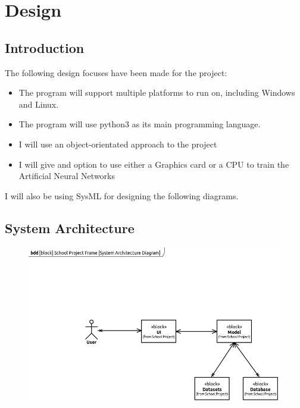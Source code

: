 \documentclass[./project-report/src/latex/project-report.tex]{subfiles}
\begin{document}
\maketitle

\section{Design}  %

\subsection{Introduction}

The following design focuses have been made for the project:

\begin{itemize}
    \item The program will support multiple platforms to run on, including Windows and Linux.
    \item The program will use python3 as its main programming language.
    \item I will use an object-orientated approach to the project
    \item I will give and option to use either a Graphics card or a CPU to train the Artificial Neural Networks
\end{itemize}

I will also be using SysML for designing the following diagrams.

\subsection{System Architecture}

\begin{figure}[h!]
\centering
\includegraphics[width=1\textwidth]{./project-report/src/images/system-architecture-diagram.png}
\end{figure}
\end{document}
